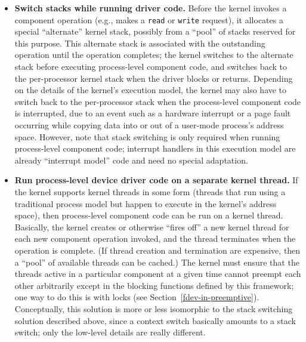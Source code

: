 \begin{itemize}
\item	{\bf Switch stacks while running driver code.}
	Before the kernel invokes a component operation
	(e.g., makes a {\tt read} or {\tt write} request),
	it allocates a special ``alternate'' kernel stack,
	possibly from a ``pool'' of stacks reserved for this purpose.
	This alternate stack is associated with the outstanding operation
	until the operation completes;
	the kernel switches to the alternate stack
	before executing process-level component code,
	and switches back to the per-processor kernel stack
	when the driver blocks or returns.
	Depending on the details of the kernel's execution model,
	the kernel may also have to switch back to the per-processor stack
	when the process-level component code is interrupted,
	due to an event such as a hardware interrupt
	or a page fault occurring while copying data
	into or out of a user-mode process's address space.
	However, note that stack switching is only required
	when running process-level component code;
	interrupt handlers in this execution model
	are already ``interrupt model'' code and need no special adaptation.

\item	{\bf Run process-level device driver code on a separate kernel thread.}
	If the kernel supports kernel threads in some form
	(threads that run using a traditional process model
	but happen to execute in the kernel's address space),
	then process-level component code can be run on a kernel thread.
	Basically, the kernel creates or otherwise ``fires off''
	a new kernel thread for each new component operation invoked,
	and the thread terminates when the operation is complete.
	(If thread creation and termination are expensive,
	then a ``pool'' of available threads can be cached.)
	The kernel must ensure that the threads
	active in a particular component at a given time
	cannot preempt each other arbitrarily except
	in the blocking functions defined by this framework;
	one way to do this is with locks (see Section~\ref{fdev-in-preemptive}).
	Conceptually, this solution is more or less isomorphic
	to the stack switching solution described above,
	since a context switch basically amounts to a stack switch;
	only the low-level details are really different.


\end{itemize}
